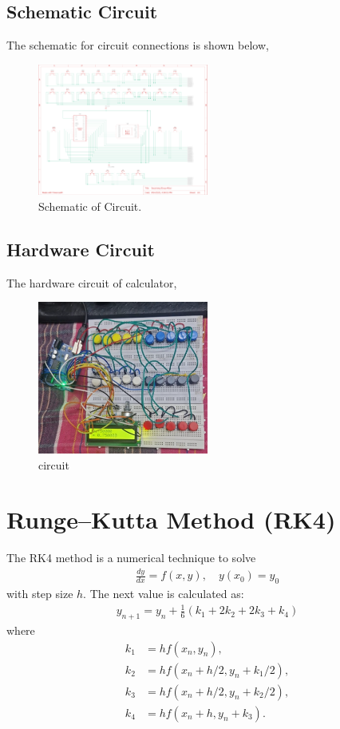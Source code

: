 \documentclass[conference]{IEEEtran}
\begin{document}
\subsection{Schematic Circuit}
The schematic for circuit connections is shown below,
\begin{figure}[htbp]
    \centering
    \includegraphics[width=0.5\textwidth]{figs/schematic.png}
    \caption{Schematic of Circuit.}
    \label{fig:circuit_schematic}
\end{figure}


\subsection{Hardware Circuit}
The hardware circuit of calculator,
\begin{figure}[htbp]
    \centering
    \includegraphics[width=0.5\textwidth]{figs/circuit.png}
    \caption{circuit}
    \label{fig:circuit}
\end{figure}


\appendices

\section{Runge--Kutta Method (RK4)}

\label{appendix:rk4}
The RK4 method is a numerical technique to solve
\begin{align}
\frac{dy}{dx} = f(x,y), \quad y(x_0)=y_0
\end{align}
with step size $h$. The next value is calculated as:
\begin{align}
y_{n+1} = y_n + \frac{1}{6}(k_1 + 2 k_2 + 2 k_3 + k_4)
\end{align}
where
\begin{align}
k_1 &= h f(x_n, y_n), \\
k_2 &= h f(x_n + h/2, y_n + k_1/2), \\
k_3 &= h f(x_n + h/2, y_n + k_2/2), \\
k_4 &= h f(x_n + h, y_n + k_3).
\end{align}
\end{document}
